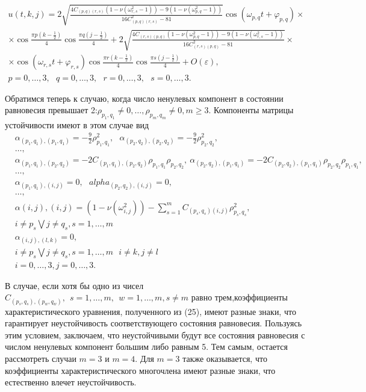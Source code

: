\documentclass[12pt]{article}  %
\begin{document}
         
\begin{multline}
u(t,k,j) = 2\sqrt{\frac{4C_{(p,q)(r,s)}(1-\nu(\omega^2_{r,s}-1))-9(1-\nu(\omega^2_{p,q}-1))}{16C^2_{(p,q)(r,s)}-81}}\cos(\omega_{p,q}t+\varphi_{p,q})\times\\
\times\cos\frac{\pi p(k-\frac{1}{2})}4\cos\frac{\pi q(j-\frac{1}{2})}4+2\sqrt{\frac{4C_{(r,s)(p,q)}(1-\nu(\omega^2_{p,q}-1))-9(1-\nu(\omega^2_{r,s}-1))}{16C^2_{(r,s)(p,q)}-81}}\times\\
\times\cos(\omega_{r,s}t+\varphi_{r,s})\cos\frac{\pi r(k-\frac{1}{2})}4\cos\frac{\pi s(j-\frac{1}{2})}4 + O(\varepsilon),\\
p=0,\dots,3, \ \ \ q=0,\dots,3, \ \ \ r=0,\dots,3, \ \ \ s=0,\dots,3.
\end{multline}

Обратимся теперь к случаю,  когда число ненулевых компонент в состоянии равновесия превышает 2:$\rho_{p_1,q_1}\not=0,\dots,\rho_{p_m,q_m}\not=0, m\geq3$. Компоненты матрицы устойчивости имеют в этом случае вид
\begin{equation}
\begin{split}
&\alpha_{(p_1,q_1),(p_1,q_1)}=-\frac{9}{2}\rho^2_{p_1,q_1}, \ \ \ \alpha_{(p_2,q_2),(p_2,q_2)}=-\frac{9}{2}\rho^2_{p_2,q_2}, \\
&\dots,\\
&\alpha_{(p_1,q_1),(p_2,q_2)}=-2C_{(p_1,q_1),(p_2,q_2)}\rho_{p_1,q_1}\rho_{p_2,q_2}, \  \alpha_{(p_2,q_2),(p_1,q_1)}=-2C_{(p_2,q_2),(p_1,q_1)}\rho_{p_2,q_2}\rho_{p_1,q_1}, \\
&\dots,\\
&\alpha_{(p_1,q_1),(i,j)} = 0,\ \ \ alpha_{(p_2,q_2),(i,j)} = 0,\\
&\dots,\\
&\alpha{(i,j),(i,j)}=(1-\nu(\omega^2_{i,j}))-\sum_{s=1}^{m}C_{(p_s,q_s)(i,j)}\rho^2_{p_s,q_s},\\
&i\not=p_s \bigvee j\not=q_s, s=1,\dots,m\\
&\alpha_{(i,j),(l,k)} = 0, \\
&i\not=p_s \bigvee j\not=q_s, s=1,\dots,m \ \ \ i\not=k,j\not=l\\
&i=0,\dots,3,j=0,\dots,3.
\end{split}
\end{equation}

В случае, если хотя бы одно из чисел $C_{(p_s,q_s),(p_w,q_w)}, \ \ s=1,\dots,m, \ \ w=1,\dots,m, s\not=m$ равно трем,коэффициенты характеристического уравнения, полученного из (25), имеют разные знаки, что гарантирует неустойчивость соответствующего состояния равновесия. Пользуясь этим условием, заключаем, что неустойчивыми будут все состояния равновесия с числом ненулевых компонент большим либо равным 5. Тем самым, остается рассмотреть случаи $m=3$ и $m=4$. Для $m=3$ также оказывается, что коэффициенты характеристического многочлена имеют разные знаки, что естественно влечет неустойчивость.
\end{document}
